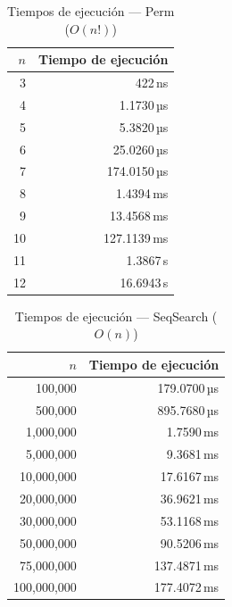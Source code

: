 \documentclass{article}
\begin{document}
\begin{table}[ht]
  \centering
  \caption{Tiempos de ejecución — Perm ($O(n!)$)}
  \label{tab:perm}
  \begin{tabular}{rr}
    \toprule
    $n$ & Tiempo de ejecución \\
    \midrule
    3 & 422\,ns \\
    4 & 1.1730\,µs \\
    5 & 5.3820\,µs \\
    6 & 25.0260\,µs \\
    7 & 174.0150\,µs \\
    8 & 1.4394\,ms \\
    9 & 13.4568\,ms \\
    10 & 127.1139\,ms \\
    11 & 1.3867\,s \\
    12 & 16.6943\,s \\
    \bottomrule
  \end{tabular}
\end{table}

\begin{table}[ht]
  \centering
  \caption{Tiempos de ejecución — SeqSearch ($O(n)$)}
  \label{tab:seqsearch}
  \begin{tabular}{rr}
    \toprule
    $n$ & Tiempo de ejecución \\
    \midrule
    100,000 & 179.0700\,µs \\
    500,000 & 895.7680\,µs \\
    1,000,000 & 1.7590\,ms \\
    5,000,000 & 9.3681\,ms \\
    10,000,000 & 17.6167\,ms \\
    20,000,000 & 36.9621\,ms \\
    30,000,000 & 53.1168\,ms \\
    50,000,000 & 90.5206\,ms \\
    75,000,000 & 137.4871\,ms \\
    100,000,000 & 177.4072\,ms \\
    \bottomrule
  \end{tabular}
\end{table}
\end{document}
